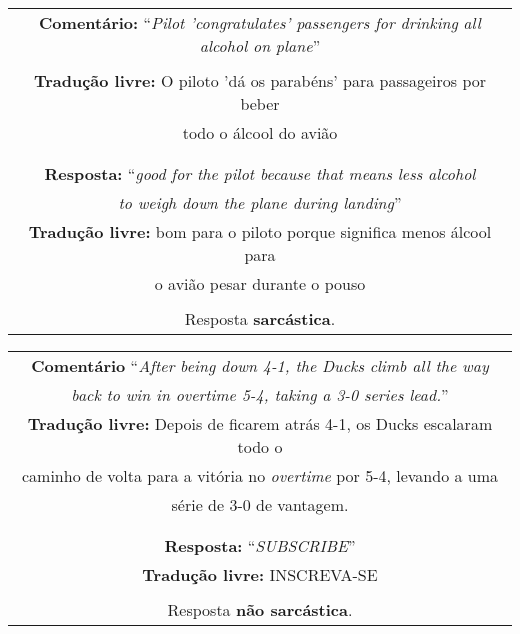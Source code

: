 \begin{center}
\begin{tabular}{|c|}

\hline

\textbf{Comentário:} ``\textit{Pilot 'congratulates' passengers for drinking}
\textit{all alcohol on plane}'' \\
\\

\textbf{Tradução livre:} O piloto 'dá os parabéns' para passageiros por beber \\
todo o álcool do avião \\\\

\hline

\\

\textbf{Resposta:} ``\textit{good for the pilot because that means less alcohol} \\
\textit{to weigh down the plane during landing}'' \\

\textbf{Tradução livre:} bom para o piloto porque significa menos álcool para \\
o avião pesar durante o pouso \\ \\

Resposta \textbf{sarcástica}.

\\ \hline

\end{tabular}
\end{center}

\begin{center}
\begin{tabular}{|c|}

\hline

\textbf{Comentário} ``\textit{After being down 4-1, the Ducks climb all the way} \\
\textit{back to win in overtime 5-4, taking a 3-0 series lead.}'' \\

\textbf{Tradução livre:} Depois de ficarem atrás 4-1, os Ducks escalaram todo o \\
caminho de volta para a vitória no \textit{overtime} por 5-4, levando a uma \\
série de 3-0 de vantagem. \\\\

\hline

\\

\textbf{Resposta:} ``\textit{SUBSCRIBE}'' \\

\textbf{Tradução livre:} INSCREVA-SE \\ \\

Resposta \textbf{não sarcástica}.

\\ \hline

\end{tabular}
\end{center}

